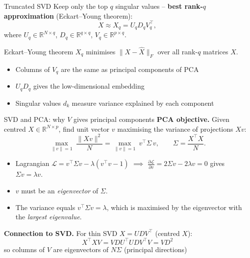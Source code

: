 \documentclass[aspectratio=169,t]{beamer}
\begin{document}
\begin{frame}{Truncated SVD}
  Keep only the top $q$ singular values -- \textbf{best rank-$q$ approximation} (Eckart–Young theorem):
  $$X \approx X_q = U_q D_q V_q^\top,$$
  where $U_q \in \mathbb{R}^{N\times q}$, $D_q \in \mathbb{R}^{q\times q}$, $V_q \in \mathbb{R}^{p\times q}$.
  \vspace{0.2cm}
  \begin{block}{Eckart--Young theorem}
    $X_q$ minimises $\|X - \hat X\|_F$ over all rank-$q$ matrices $\hat X$.
  \end{block}
  \vspace{0.2cm}
  \begin{itemize}
    \item Columns of $V_q$ are the same as principal components of PCA
    \item $U_q D_q$ gives the low-dimensional embedding
    \item Singular values $d_k$ measure variance explained by each component
  \end{itemize}
\end{frame}

\begin{frame}{SVD and PCA: why $V$ gives principal components}
  \textbf{PCA objective.} Given centred $X \in \mathbb{R}^{N\times p}$, find unit vector $v$ maximising the variance of projections $Xv$:
  $$\max_{\|v\|=1}\ \frac{\|Xv\|^2}{N} = \max_{\|v\|=1}\ v^\top \Sigma\, v,\qquad \Sigma = \frac{X^\top X}{N}.$$

  \begin{itemize}
    \item Lagrangian $\mathcal{L}=v^\top \Sigma v - \lambda(v^\top v-1)$ $\implies$ $\frac{\partial \mathcal{L}}{\partial v} = 2\Sigma v - 2\lambda v = 0$ gives $\Sigma v = \lambda v$.
    \item $v$ must be an \emph{eigenvector} of $\Sigma$.
    \item The variance equals $v^\top \Sigma v = \lambda$, which is maximised by the eigenvector with the \emph{largest eigenvalue}.
  \end{itemize}

  \vspace{0.2cm}
  \textbf{Connection to SVD.} For thin SVD $X = UDV^\top$ (centred $X$):
  $$X^\top X V = VD U^\top UDV^\top V= VD^2$$
  so columns of $V$ are eigenvectors of $N\Sigma$ (principal directions)
\end{frame}
\end{document}
